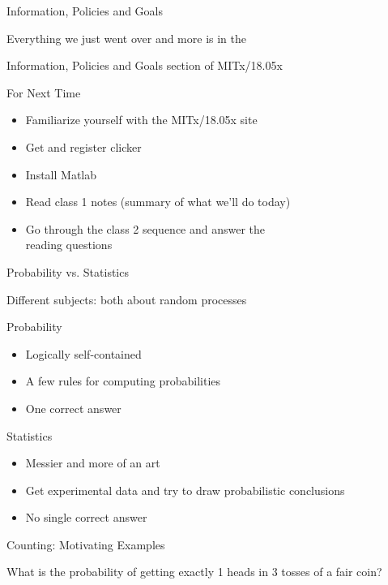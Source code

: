 \begin{frame}{Information, Policies and Goals}

{\Large Everything we just went over and more is in the 

\bigskip

Information, Policies and Goals section of MITx/18.05x
}
\end{frame}

\begin{frame}{For Next Time}

{\Large
\begin{itemize}
\item Familiarize yourself with the MITx/18.05x site
\item Get and register clicker
\item Install Matlab\\\phantom{xxx}
\item Read class 1 notes (summary of what we'll do today)
\item Go through the class 2 sequence and answer the\\ 
  reading questions
\end{itemize}
}
\end{frame}

\begin{frame}{Probability vs. Statistics}

{\Large
Different subjects: both about random processes

\bigskip

Probability
\begin{itemize}
\item Logically self-contained
\item A few rules for computing probabilities
\item One correct answer
\end{itemize}

Statistics
\begin{itemize}
\item Messier and more of an art
\item Get experimental data and try to draw probabilistic conclusions
\item No single correct answer
\end{itemize}
}
\end{frame}

\begin{frame}{Counting: Motivating Examples}

{\Large
What is the probability of getting exactly 1 heads in 3 tosses of
a fair coin?

}

\end{frame}

